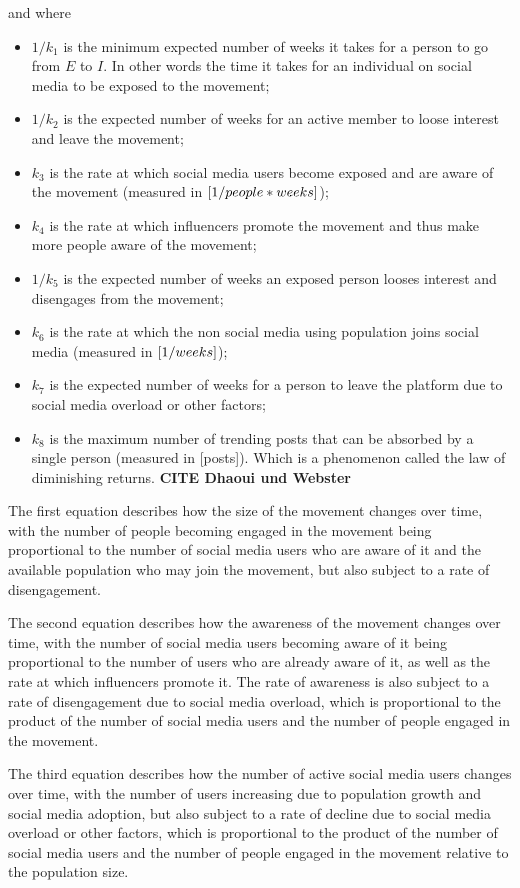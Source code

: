 \documentclass{article}
\begin{document}
    and where
    \begin{itemize}
        \item $1/k_1$ is the minimum expected number of weeks it takes for a person to go from $E$ to $I$. In other words the time it takes for an individual on social media to be exposed to the movement;
        \item $1/k_2$ is the expected number of weeks for an active member to loose interest and leave the movement;
        \item $k_3$ is the rate at which social media users become exposed and are aware of the movement (measured in $[\text1/{people*weeks}]$);
        \item $k_4$ is the rate at which influencers promote the movement and thus make more people aware of the movement; 
        \item $1/k_5$ is the expected number of weeks an exposed person looses interest and disengages from the movement;
        \item $k_6$ is the rate at which the non social media using population joins social media (measured in $[\text1/{weeks}]$);
        \item $k_7$ is the expected number of weeks for a person to leave the platform due to social media overload or other factors; 
        \item $k_8$ is the maximum number of trending posts that can be absorbed by a single person (measured in [posts]). Which is a phenomenon called the law of diminishing returns. \textbf{CITE Dhaoui und Webster}
    \end{itemize}
    
    The first equation describes how the size of the movement changes over time, with the number of people becoming engaged in the movement being proportional to the number of social media users who are aware of it and the available population who may join the movement, but also subject to a rate of disengagement. 
    
	The second equation describes how the awareness of the movement changes over time, with the number of social media users becoming aware of it being proportional to the number of users who are already aware of it, as well as the rate at which influencers promote it. The rate of awareness is also subject to a rate of disengagement due to social media overload, which is proportional to the product of the number of social media users and the number of people engaged in the movement. 
 
	The third equation describes how the number of active social media users changes over time, with the number of users increasing due to population growth and social media adoption, but also subject to a rate of decline due to social media overload or other factors, which is proportional to the product of the number of social media users and the number of people engaged in the movement relative to the population size. 
 
\end{document}
